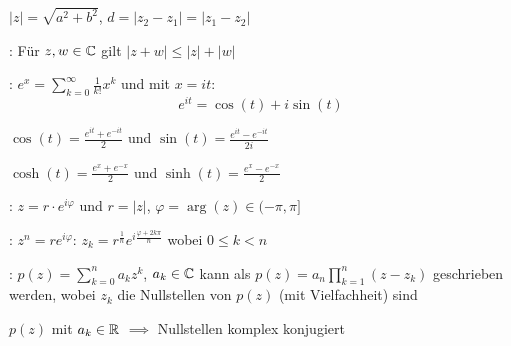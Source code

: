 \Def {} $|z| = \sqrt{a^2 + b^2}$,
 $d = |z_2 - z_1| = |z_1 - z_2|$

\Satz {}: Für $z, w \in \mathbb{C}$ gilt $|z + w|\le |z| + |w|$

\Satz {}: $e^x = \sum_{k=0}^{\infty}\frac{1}{k!}x^k$ und mit $x = it$:
$$e^{it} = \cos(t) + i\sin(t)$$

\Kor $\cos(t) = \frac{e^{it} + e^{-it}}{2}$ und $\sin(t) = \frac{e^{it} - e^{-it}}{2i}$

\Def $\cosh(t) = \frac{e^x + e^{-x}}{2}$ und $\sinh(t) = \frac{e^x - e^{-x}}{2}$

\Def {}: $z = r \cdot e^{i\varphi}$ und $r = |z|$, $\varphi = \arg(z) \in (-\pi, \pi]$

\Satz {}: $z^n = re^{i\varphi}$: 
$z_k = r^{\frac{1}{n}}e^{i\frac{\varphi + 2k\pi}{n}}$ wobei $0\le k < n$

\Satz {}: $p(z) = \sum_{k=0}^{n} a_k z^k$, $a_k \in \mathbb{C}$
kann als $p(z) = a_n\prod_{k=1}^{n}(z-z_k)$ geschrieben werden, wobei $z_k$ die Nullstellen
von $p(z)$ (mit Vielfachheit) sind

\Satz $p(z)$ mit $a_k \in \mathbb{R}$ $\implies$ Nullstellen komplex konjugiert